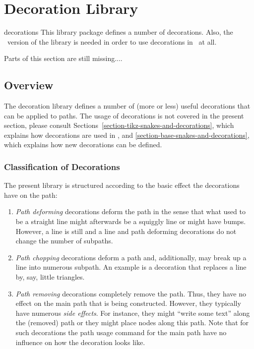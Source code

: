 %
%
%

\section{Decoration Library}
\label{section-library-decorations}

\begin{pgflibrary}{decorations}
  This library package defines a number of decorations. Also, the
  \tikzname\ version of the library is needed in order to use
  decorations in \tikzname\ at all.
\end{pgflibrary}

Parts of this section are still missing....


\subsection{Overview}

The decoration library defines a number of (more or less) useful
decorations that can be applied to paths. The usage of decorations is
not covered in the present section, please consult 
Sections~\ref{section-tikz-snakes-and-decorations}, which explains how
decorations are used in \tikzname, and
\ref{section-base-snakes-and-decorations}, which  explains how new
decorations can be defined. 

\subsubsection{Classification of Decorations}

The present library is structured according to the basic effect the
decorations have on the path:
\begin{enumerate}
\item \emph{Path deforming} decorations deform the path in the sense
  that what used to be a straight  line might afterwards be a squiggly
  line or might have bumps. However, a line is still and a line and
  path deforming decorations do not change the number of subpaths.
\item \emph{Path chopping} decorations deform a path and,
  additionally, may break up a line into numerous subpath. An example
  is a decoration that replaces a line by, say, little triangles.
\item \emph{Path removing} decorations completely remove the
  path. Thus, they have no effect on the main path that is being
  constructed. However, they typically have numerous \emph{side
    effects}. For instance, they might ``write some text'' along the
  (removed) path or they might place nodes along this path. Note that
  for such decorations the path usage command for the main path have
  no influence on how the decoration looks like.
\end{enumerate}

